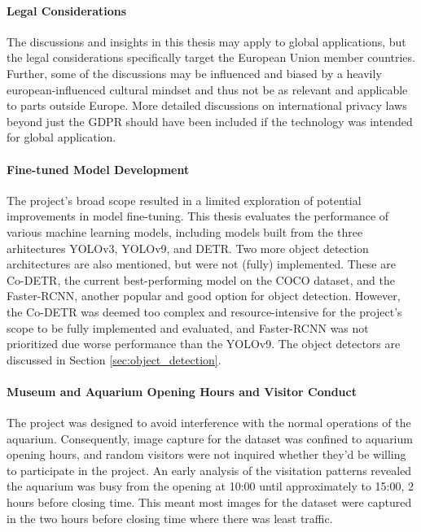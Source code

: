 \paragraph{Legal Considerations}
The discussions and insights in this thesis may apply to global applications, but the legal considerations specifically target the European Union member countries. Further, some of the discussions may be influenced and biased by a heavily european-influenced cultural mindset and thus not be as relevant and applicable to parts outside Europe. More detailed discussions on international privacy laws beyond just the GDPR should have been included if the technology was intended for global application.

\paragraph{Fine-tuned Model Development}
The project's broad scope resulted in a limited exploration of potential improvements in model fine-tuning. This thesis evaluates the performance of various machine learning models, including models built from the three arhitectures YOLOv3, YOLOv9, and DETR. Two more object detection architectures are also mentioned, but were not (fully) implemented. These are Co-DETR, the current best-performing model on the COCO dataset, and the Faster-RCNN, another popular and good option for object detection. However, the Co-DETR was deemed too complex and resource-intensive for the project's scope to be fully implemented and evaluated, and Faster-RCNN was not prioritized due worse performance than the YOLOv9. The object detectors are discussed in Section \ref{sec:object_detection}.

\paragraph{Museum and Aquarium Opening Hours and Visitor Conduct}
\label{sec:scope_opening_hours}
The project was designed to avoid interference with the normal operations of the aquarium. Consequently, image capture for the dataset was confined to aquarium opening hours, and random visitors were not inquired whether they'd be willing to participate in the project. An early analysis of the visitation patterns revealed the aquarium was busy from the opening at 10:00 until approximately to 15:00, 2 hours before closing time. This meant most images for the dataset were captured in the two hours before closing time where there was least traffic.

